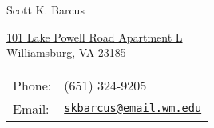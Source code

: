 \documentclass[letterpaper,10pt]{article}
\def\name{Scott K. Barcus}
\begin{document}
\renewcommand{\baselinestretch}{0.0}{
{\huge \name}


\vspace{0.25in}

\begin{minipage}{0.45\linewidth}
  \href{http://www.wm.edu/}{101 Lake Powell Road Apartment L} \\
  Williamsburg, VA 23185 \\
\end{minipage}
\begin{minipage}{0.45\linewidth}
  \begin{tabular}{ll}
    Phone: & (651) 324-9205 \\
    Email: & \href{mailto:me@email.wm.edu}{\tt skbarcus@email.wm.edu} \\
  \end{tabular}
\end{minipage}




}
\end{document}
